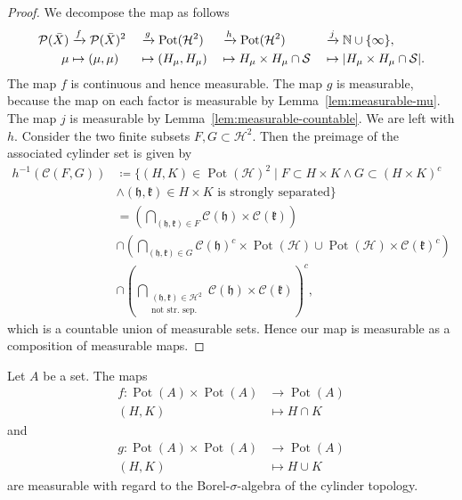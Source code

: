 \begin{proof}
  We decompose the map as follows
  \begin{alignat*}{4}
    \mathcal{P}(\bar X) &\xrightarrow{f} \mathcal{P}(\bar X)^2&&\xrightarrow{g} \operatorname{Pot}(\mathcal{H}^2) &&\xrightarrow{h} \operatorname{Pot}(\mathcal{H}^2) &&\xrightarrow{j} \mathbb{N} \cup \{\infty\},\\
    \mu &\mapsto (\mu, \mu) &&\mapsto (H_\mu, H_\mu)&&\mapsto H_\mu \times H_\mu \cap \mathcal{S} &&\mapsto |H_\mu \times H_\mu \cap \mathcal{S}|.
  \end{alignat*}
  The map \(f\) is continuous and hence measurable. The map \(g\) is measurable, because the map on each factor is measurable by Lemma~\ref{lem:measurable-mu}. The map \(j\) is measurable by Lemma~\ref{lem:measurable-countable}. We are left with \(h\). Consider the two finite subsets \(F, G \subset \mathcal{H}^2\). Then the preimage of the associated cylinder set is given by
  \begin{align*}
    h^{-1}(\mathcal{C}(F,G)) & \coloneqq \{(H, K) \in \operatorname{Pot}(\mathcal{H})^2 \mid F \subset H \times K \wedge G \subset (H \times K)^c\\
    & \wedge (\mathfrak{h}, \mathfrak{k}) \in H \times K \text{ is strongly separated}\}\\
      & = \left (\bigcap_{(\mathfrak{h},\mathfrak{k}) \in F} \mathcal{C}(\mathfrak{h}) \times \mathcal{C}(\mathfrak{k})\right)\\
      & \cap \left (\bigcap_{(\mathfrak{h},\mathfrak{k}) \in G} \mathcal{C}(\mathfrak{h})^c \times \operatorname{Pot}(\mathcal{H}) \cup \operatorname{Pot}(\mathcal{H}) \times \mathcal{C}(\mathfrak{k})^c \right)\\
      & \cap \left( \bigcap_{\substack{(\mathfrak{h}, \mathfrak{k}) \in \mathcal{H}^2\\\text{not str.\ sep.}}} \mathcal{C}(\mathfrak{h}) \times \mathcal{C}(\mathfrak{k})\right)^c,
  \end{align*}
  which is a countable union of measurable sets. Hence our map is measurable as a composition of measurable maps.
\end{proof}

\begin{lemma}
  Let \(A\) be a set. The maps
  \begin{align*}
    f \colon \operatorname{Pot}(A) \times \operatorname{Pot}(A) & \to \operatorname{Pot}(A)\\
    (H, K) & \mapsto H \cap K
  \end{align*}
  and
  \begin{align*}
    g \colon \operatorname{Pot}(A) \times \operatorname{Pot}(A) & \to \operatorname{Pot}(A)\\
    (H, K) & \mapsto H \cup K
  \end{align*}
  are measurable with regard to the Borel-\(\sigma\)-algebra of the cylinder topology.
\end{lemma}

